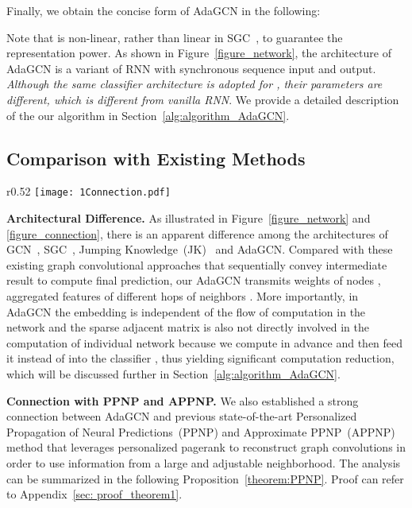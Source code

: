 \documentclass{article} \usepackage{iclr2021_conference,times}
\begin{document}
Finally, we obtain the concise form of AdaGCN in the following:


Note that  is non-linear, rather than linear in SGC~\citep{wu2019simplifying}, to guarantee the representation power. As shown in Figure~\ref{figure_network}, the architecture of AdaGCN is a variant of RNN with synchronous sequence input and output. \textit{Although the same classifier architecture is adopted for , their parameters are different, which is different from vanilla RNN}. We provide a detailed description of the our algorithm in Section~\ref{alg:algorithm_AdaGCN}.		

\subsection{Comparison with Existing Methods}
\begin{wrapfigure}[16]{r}{0.52\textwidth}
	\texttt{[image: 1Connection.pdf]}
	\caption{Comparison of the graph model architectures.  in JK network  denotes one aggregation layer with aggregation function such as concatenation or max pooling.}
	\label{figure_connection}
\end{wrapfigure}

\textbf{Architectural Difference.} As illustrated in Figure~\ref{figure_network} and \ref{figure_connection}, there is an apparent difference among the architectures of GCN~\citep{kipf2016semi}, SGC~\citep{wu2019simplifying}, Jumping Knowledge~(JK)~\citep{xu2018representation} and AdaGCN. Compared with these existing graph convolutional approaches that sequentially convey intermediate result  to compute final prediction, our AdaGCN transmits weights of nodes , aggregated features of different hops of neighbors . More importantly, in AdaGCN the embedding  is independent of the flow of computation in the network  and the sparse adjacent matrix  is also not directly involved in the computation of individual network because we compute  in advance and then feed it instead of  into the classifier , thus yielding significant computation reduction, which will be discussed further in  Section~\ref{alg:algorithm_AdaGCN}.

\textbf{Connection with PPNP and APPNP.} We also established a strong connection between AdaGCN and previous state-of-the-art Personalized Propagation of Neural Predictions~(PPNP) and Approximate PPNP~(APPNP)~\citep{klicpera2018predict} method that leverages personalized pagerank to reconstruct graph convolutions in order to use information from a large and adjustable neighborhood. The analysis can be summarized in the following Proposition~\ref{theorem:PPNP}. Proof can refer to Appendix~\ref{sec: proof_theorem1}.
\end{document}
